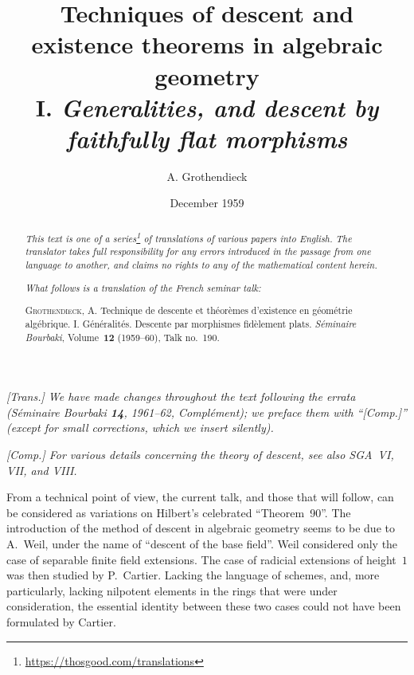 \documentclass{article}
\title{Techniques of descent and existence theorems in algebraic geometry\\I. \emph{Generalities, and descent by faithfully flat morphisms}}
\author{A. Grothendieck}
\date{December 1959}
\newcommand{\doctype}{French seminar talk}
\newcommand{\origcit}{%
  \textsc{Grothendieck, A.}
  Technique de descente et th\'{e}or\`{e}mes d'existence en g\'{e}om\'{e}trie alg\'{e}brique. I. G\'{e}n\'{e}ralit\'{e}s. Descente par morphismes fid\`{e}lement plats.
  \emph{S\'{e}minaire Bourbaki}, Volume~\textbf{12} (1959--60), Talk no.~190.%
}
\newcommand{\oldpage}[1]{\marginpar{\footnotesize$\Big\vert$ \textit{p.~#1}}}
\begin{document}
\maketitle
\thispagestyle{fancy}

\renewcommand{\abstractname}{Translator's note.}

\begin{abstract}
  \renewcommand*{\thefootnote}{\fnsymbol{footnote}}
  \emph{This text is one of a series\footnote{\url{https://thosgood.com/translations}} of translations of various papers into English.}
  \emph{The translator takes full responsibility for any errors introduced in the passage from one language to another, and claims no rights to any of the mathematical content herein.}

  \medskip
  
  \emph{What follows is a translation of the \doctype:}

  \medskip\noindent
  \origcit
\end{abstract}

\setcounter{footnote}{0}

\setcounter{tocdepth}{1}
\tableofcontents



\subsubsection*{}

\emph{[Trans.] We have made changes throughout the text following the errata (\emph{S\'{e}minaire Bourbaki} \textbf{14}, 1961--62, Compl\'{e}ment); we preface them with ``[Comp.]'' (except for small corrections, which we insert silently).}
\medskip

\emph{[Comp.] For various details concerning the theory of descent, see also SGA~VI, VII, and VIII.}
\medskip

\oldpage{190-01}
From a technical point of view, the current talk, and those that will follow, can be considered as variations on Hilbert's celebrated ``Theorem~90''.
The introduction of the method of descent in algebraic geometry seems to be due to A.~Weil, under the name of ``descent of the base field''.
Weil considered only the case of separable finite field extensions.
The case of radicial extensions of height~$1$ was then studied by P.~Cartier.
Lacking the language of schemes, and, more particularly, lacking nilpotent elements in the rings that were under consideration, the essential identity between these two cases could not have been formulated by Cartier.
\end{document}

